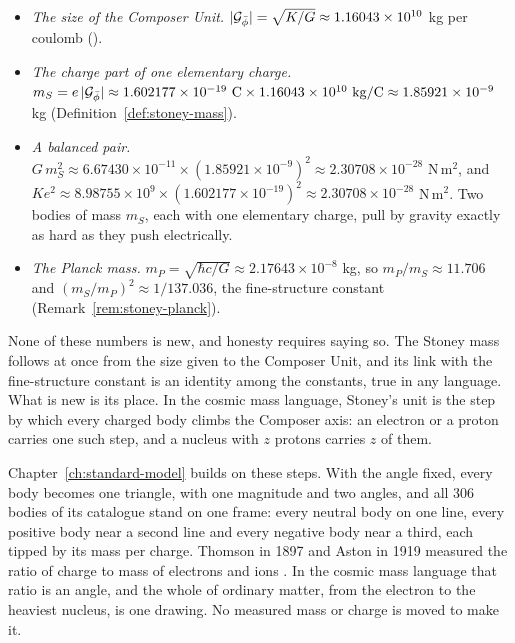 \par{}\baselineskip{}\baselineskip{}\baselineskip{}\baselineskip\vskip 0pt
\begin{workedexample}
\begin{itemize}
  \item \emph{The size of the Composer Unit.} $|\mathcal{G}_{\bar{\phi}}| = \sqrt{K/G} \approx 1.16043 \times 10^{10}$ kg per coulomb ().
  \item \emph{The charge part of one elementary charge.} $m_S = e\,|\Gp| \approx 1.602177 \times 10^{-19}\ \mathrm{C} \times 1.16043 \times 10^{10}\ \mathrm{kg/C} \approx 1.85921 \times 10^{-9}$ kg (Definition~\ref{def:stoney-mass}).
  \item \emph{A balanced pair.} $G\,m_S^2 \approx 6.67430 \times 10^{-11} \times (1.85921 \times 10^{-9})^2 \approx 2.30708 \times 10^{-28}$ N\,m$^2$, and $K e^2 \approx 8.98755 \times 10^{9} \times (1.602177 \times 10^{-19})^2 \approx 2.30708 \times 10^{-28}$ N\,m$^2$. Two bodies of mass $m_S$, each with one elementary charge, pull by gravity exactly as hard as they push electrically.
  \item \emph{The Planck mass.} $m_P = \sqrt{\hbar c/G} \approx 2.17643 \times 10^{-8}$ kg, so $m_P/m_S \approx 11.706$ and $(m_S/m_P)^2 \approx 1/137.036$, the fine-structure constant (Remark~\ref{rem:stoney-planck}).
\end{itemize}
\end{workedexample}

None of these numbers is new, and honesty requires saying so. The Stoney mass follows at once from the size given to the Composer Unit, and its link with the fine-structure constant is an identity among the constants, true in any language. What is new is its place. In the cosmic mass language, Stoney's unit is the step by which every charged body climbs the Composer axis: an electron or a proton carries one such step, and a nucleus with $z$ protons carries $z$ of them.

Chapter~\ref{ch:standard-model} builds on these steps. With the angle fixed, every body becomes one triangle, with one magnitude and two angles, and all $306$ bodies of its catalogue stand on one frame: every neutral body on one line, every positive body near a second line and every negative body near a third, each tipped by its mass per charge. Thomson in 1897 and Aston in 1919 measured the ratio of charge to mass of electrons and ions \citep{Thomson1897,Aston1919}. In the cosmic mass language that ratio is an angle, and the whole of ordinary matter, from the electron to the heaviest nucleus, is one drawing. No measured mass or charge is moved to make it.

